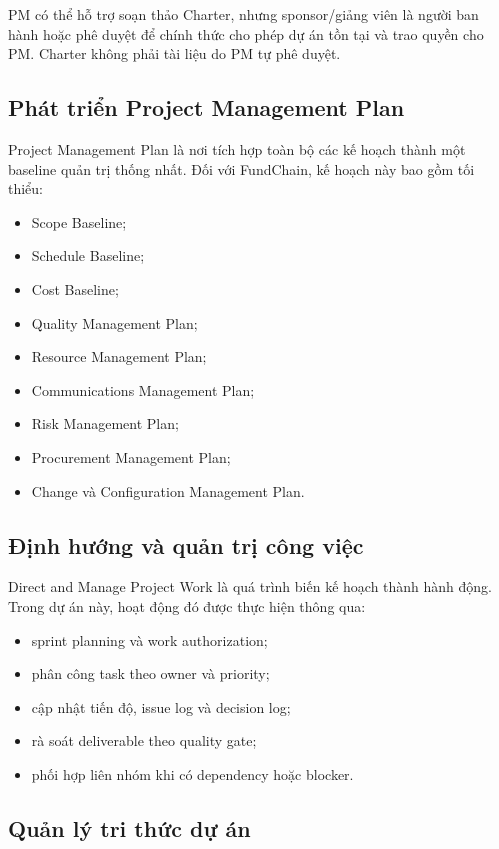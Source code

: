 PM có thể hỗ trợ soạn thảo Charter, nhưng sponsor/giảng viên là người ban hành hoặc phê duyệt để chính thức cho phép dự án tồn tại và trao quyền cho PM. Charter không phải tài liệu do PM tự phê duyệt.

\subsection{Phát triển Project Management Plan}

Project Management Plan là nơi tích hợp toàn bộ các kế hoạch thành một baseline quản trị thống nhất. Đối với FundChain, kế hoạch này bao gồm tối thiểu:

\begin{itemize}
  \item Scope Baseline;
  \item Schedule Baseline;
  \item Cost Baseline;
  \item Quality Management Plan;
  \item Resource Management Plan;
  \item Communications Management Plan;
  \item Risk Management Plan;
  \item Procurement Management Plan;
  \item Change và Configuration Management Plan.
\end{itemize}

\subsection{Định hướng và quản trị công việc}

Direct and Manage Project Work là quá trình biến kế hoạch thành hành động. Trong dự án này, hoạt động đó được thực hiện thông qua:

\begin{itemize}
  \item sprint planning và work authorization;
  \item phân công task theo owner và priority;
  \item cập nhật tiến độ, issue log và decision log;
  \item rà soát deliverable theo quality gate;
  \item phối hợp liên nhóm khi có dependency hoặc blocker.
\end{itemize}

\subsection{Quản lý tri thức dự án}

